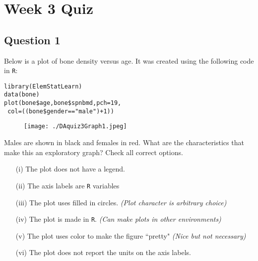 \documentclass[12pt]{article}
\begin{document}

\section*{Week 3 Quiz}

\subsection*{Question 1}
Below is a plot of bone density versus age. It was created using the following
code in \texttt{R}:

\begin{framed}
\begin{verbatim}
library(ElemStatLearn)
data(bone)
plot(bone$age,bone$spnbmd,pch=19,
 col=((bone$gender=="male")+1))
\end{verbatim}
\end{framed}

\begin{figure}[h!]
\centering
\texttt{[image: ./DAquiz3Graph1.jpeg]}
\end{figure}

\noindent Males are shown in black and females in red. What are the characteristics that make this an exploratory graph? Check all correct options.

\begin{itemize}
\item[(i)] The plot does not have a legend.
\item[(ii)] The axis labels are \texttt{R} variables
\item[(iii)] The plot uses filled in circles. \textit{(Plot character is arbitrary choice)}
\item[(iv)] The plot is made in \texttt{R}. \textit{(Can make plots in other environments)}
	\item[(v)] The plot uses color to make the figure ``pretty" \textit{(Nice but not necessary)}
\item[(vi)] The plot does not report the units on the axis labels.
\end{itemize}
\end{document}
